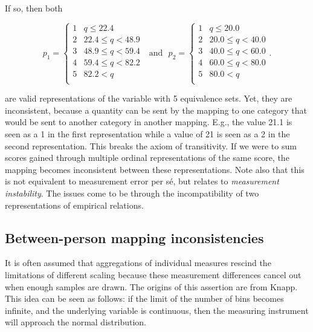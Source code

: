 \documentclass[utf8]{FrontiersinVancouver}
\begin{document}
If so, then both

\[
p_{1} = 
\begin{cases} 
    1 & q \leq 22.4\\
    2 & 22.4 \leq q < 48.9\\
    3 & 48.9 \leq q < 59.4\\
    4 & 59.4 \leq q < 82.2\\    
    5 & 82.2 < q\\
\end{cases}
\ \ \ \text{and}\ \ \ 
p_{2} =
\begin{cases} 
    1 & q \leq 20.0\\
    2 & 20.0 \leq q < 40.0\\
    3 & 40.0 \leq q < 60.0\\
    4 & 60.0 \leq q < 80.0\\    
    5 & 80.0 < q\\
\end{cases}.
\]

are valid representations of the variable with 5 equivalence sets. Yet, they are inconsistent, because a quantity can be sent by the mapping to one category that would be sent to another category in another mapping. E.g., the value 21.1 is seen as a 1 in the first representation while a value of 21 is seen as a 2 in the second representation. This breaks the axiom of transitivity. If we were to sum scores gained through multiple ordinal representations of the same score, the mapping becomes inconsistent between these representations. Note also that this is not equivalent to measurement error per sé, but relates to \textit{measurement instability}. The issues come to be through the incompatibility of two representations of empirical relations.

\subsection{Between-person mapping inconsistencies}
It is often assumed that aggregations of individual measures rescind the limitations of different scaling because these measurement differences cancel out when enough samples are drawn. The origins of this assertion are from Knapp. This idea can be seen as follows: if the limit of the number of bins becomes infinite, and the underlying variable is continuous, then the measuring instrument will approach the normal distribution. 
\end{document}
